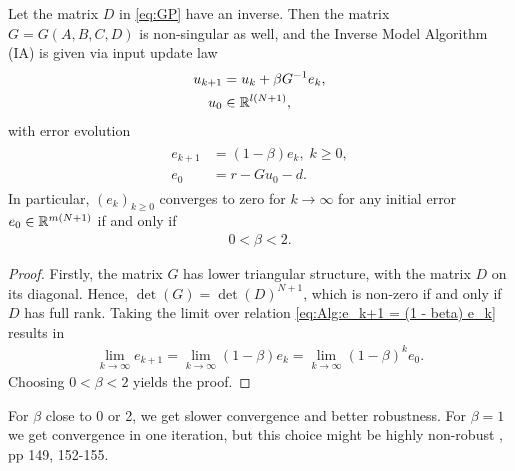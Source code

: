 \begin{alg}
	\label{alg:ILC:IA}
	Let the matrix $D$ in \eqref{eq:GP} have an inverse. Then the matrix $G = G(A, B, C, D)$ is non-singular as well, and the Inverse Model Algorithm (IA) is given via input update law 
	\begin{align}
	\label{eq:errRightInv}
	\begin{split}
	u_{k+1} &= u_k + \beta G^{-1} e_k, \\
	u_0 & \in {\mathbb{R}}^{l (N+1)},
	\end{split}	
	\end{align}
	with error evolution
	\begin{align}
	\label{eq:Alg:e_k+1 = (1 - beta) e_k}
	\begin{split}
	e_{k+1} &= (1- \beta) e_{k}, \; k\geq 0, \\
	e_0 &= r -  Gu_0 -d.
	\end{split}
	\end{align}
	In particular, $(e_k)_{k\geq 0}$ converges to zero for $k \to \infty$ for any initial error $e_0 \in {\mathbb{R}}^{m(N+1)}$ if and only if 
	\begin{align*}
	0 < \beta < 2.
	\end{align*}
\end{alg}
\begin{proof}
	Firstly, the matrix $G$ has lower triangular structure, with the matrix $D$ on its diagonal. Hence, $\det(G) = \det(D)^{N+1}$, which is non-zero if and only if $D$ has full rank. 
	Taking the limit over relation \eqref{eq:Alg:e_k+1 = (1 - beta) e_k} results in
	\begin{align}
	\lim_{k \to \infty} e_{k+1} = \lim_{k \to \infty}(1- \beta) e_{k} = \lim_{k \to \infty}(1 - \beta)^k e_0.
	\end{align}
	Choosing $0<\beta < 2$ yields the proof. 
\end{proof}

For $\beta$ close to 0 or 2, we get slower convergence and better robustness. For $\beta = 1$ we get convergence in one iteration, but this choice might be highly non-robust \cite{ILC}, pp 149, 152-155.


